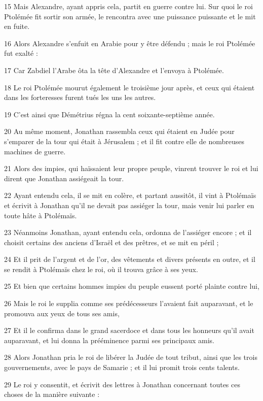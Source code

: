 \par 15 Mais Alexandre, ayant appris cela, partit en guerre contre lui. Sur quoi le roi Ptolémée fit sortir son armée, le rencontra avec une puissance puissante et le mit en fuite.
\par 16 Alors Alexandre s'enfuit en Arabie pour y être défendu ; mais le roi Ptolémée fut exalté :
\par 17 Car Zabdiel l'Arabe ôta la tête d'Alexandre et l'envoya à Ptolémée.
\par 18 Le roi Ptolémée mourut également le troisième jour après, et ceux qui étaient dans les forteresses furent tués les uns les autres.
\par 19 C'est ainsi que Démétrius régna la cent soixante-septième année.
\par 20 Au même moment, Jonathan rassembla ceux qui étaient en Judée pour s'emparer de la tour qui était à Jérusalem ; et il fit contre elle de nombreuses machines de guerre.
\par 21 Alors des impies, qui haïssaient leur propre peuple, vinrent trouver le roi et lui dirent que Jonathan assiégeait la tour.
\par 22 Ayant entendu cela, il se mit en colère, et partant aussitôt, il vint à Ptolémaïs et écrivit à Jonathan qu'il ne devait pas assiéger la tour, mais venir lui parler en toute hâte à Ptolémaïs.
\par 23 Néanmoins Jonathan, ayant entendu cela, ordonna de l'assiéger encore ; et il choisit certains des anciens d'Israël et des prêtres, et se mit en péril ;
\par 24 Et il prit de l'argent et de l'or, des vêtements et divers présents en outre, et il se rendit à Ptolémaïs chez le roi, où il trouva grâce à ses yeux.
\par 25 Et bien que certains hommes impies du peuple eussent porté plainte contre lui,
\par 26 Mais le roi le supplia comme ses prédécesseurs l'avaient fait auparavant, et le promouva aux yeux de tous ses amis,
\par 27 Et il le confirma dans le grand sacerdoce et dans tous les honneurs qu'il avait auparavant, et lui donna la prééminence parmi ses principaux amis.
\par 28 Alors Jonathan pria le roi de libérer la Judée de tout tribut, ainsi que les trois gouvernements, avec le pays de Samarie ; et il lui promit trois cents talents.
\par 29 Le roi y consentit, et écrivit des lettres à Jonathan concernant toutes ces choses de la manière suivante :
